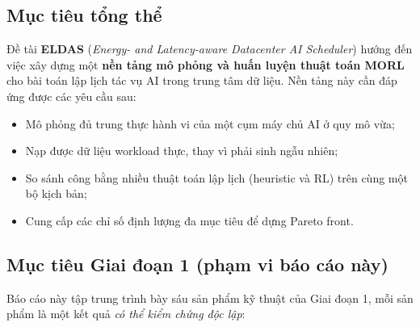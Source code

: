 \subsection{Mục tiêu tổng thể}
Đề tài \textbf{ELDAS} (\textit{Energy- and Latency-aware Datacenter AI
Scheduler}) hướng đến việc xây dựng một \textbf{nền tảng mô phỏng và huấn
luyện thuật toán MORL} cho bài toán lập lịch tác vụ AI trong trung tâm dữ
liệu. Nền tảng này cần đáp ứng được các yêu cầu sau:
\begin{itemize}
  \item Mô phỏng đủ trung thực hành vi của một cụm máy chủ AI ở quy mô vừa;
  \item Nạp được dữ liệu workload thực, thay vì phải sinh ngẫu nhiên;
  \item So sánh công bằng nhiều thuật toán lập lịch (heuristic và RL) trên
        cùng một bộ kịch bản;
  \item Cung cấp các chỉ số định lượng đa mục tiêu để dựng Pareto front.
\end{itemize}

\subsection{Mục tiêu Giai đoạn 1 (phạm vi báo cáo này)}
Báo cáo này tập trung trình bày sáu sản phẩm kỹ thuật của Giai đoạn 1, mỗi
sản phẩm là một kết quả \emph{có thể kiểm chứng độc lập}:

